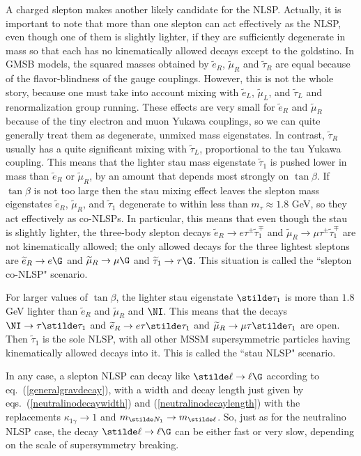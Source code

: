 A charged slepton makes another likely candidate for the NLSP.
Actually, it is important to note that more than one
slepton can act effectively as the NLSP, even though one of them is
slightly lighter, if they are sufficiently degenerate in mass so that each
has no kinematically allowed decays except to
the goldstino.
In GMSB models, the squared masses obtained by $\widetilde e_R$,
$\widetilde \mu_R$ and $\widetilde \tau_R$ are equal because of the
flavor-blindness of the gauge couplings. However, this is not the whole   
story, because
one must take into account mixing with
$\widetilde e_L$,
$\widetilde \mu_L$, and $\widetilde \tau_L$ and renormalization group
running.  These effects are very small for $\widetilde e_R$ and  
$\widetilde \mu_R$ because of the tiny electron and muon Yukawa couplings,
so we can quite generally treat them as degenerate, unmixed mass
eigenstates. In
contrast, $\widetilde \tau_R$ usually has a quite significant mixing with
$\widetilde \tau_L$, proportional to the tau Yukawa coupling. This means
that the lighter stau mass eigenstate $\widetilde \tau_1$ is pushed lower
in mass than $\widetilde e_R$ or $\widetilde \mu_R$, by an amount that
depends most strongly on $\tan\beta$.  If $\tan\beta$ is not too
large then the stau mixing effect leaves the slepton mass
eigenstates $\widetilde e_R$, $\widetilde \mu_R$, and $\widetilde \tau_1$
degenerate to within less than $m_\tau \approx 1.8 $ GeV, so they act
effectively as
co-NLSPs.  In particular, this means that even though the stau is slightly
lighter, the three-body slepton decays $\widetilde e_R \rightarrow
e\tau^\pm\widetilde \tau_1^\mp$ and $\widetilde \mu_R \rightarrow
\mu\tau^\pm\widetilde \tau_1^\mp$ are not kinematically allowed; the only
allowed decays for the three lightest sleptons are $\widetilde
e_R\rightarrow e \G$ and $\widetilde \mu_R \rightarrow \mu\G$ and
$\widetilde \tau_1 \rightarrow \tau \G$.
This situation is called the ``slepton co-NLSP"
scenario.

For larger values of $\tan\beta$, the lighter stau eigenstate
$\stilde \tau_1$ is
more than $1.8$ GeV lighter than $\widetilde e_R$ and $\widetilde \mu_R$
and $\NI$.  This means that the decays $\NI \rightarrow \tau\stilde
\tau_1$ and
$\widetilde e_R \rightarrow e \tau \stilde \tau_1$ and $\widetilde \mu_R
\rightarrow \mu \tau \stilde\tau_1$ are open.  Then $\widetilde
\tau_1$ is   
the sole NLSP, with all other MSSM supersymmetric particles having
kinematically allowed decays into it. This is called the ``stau NLSP"
scenario.

In any case, a slepton NLSP can decay like $\stilde \ell \rightarrow
\ell \G$ according to eq.~(\ref{generalgravdecay}), with a width and
decay length just given by eqs.~(\ref{neutralinodecaywidth})
and (\ref{neutralinodecaylength}) with the replacements $\kappa_{1\gamma}
\rightarrow 1$ and $m_{\stilde N_1} \rightarrow m_{\stilde \ell}$.
So, just as for the neutralino NLSP case, the decay $\stilde \ell
\rightarrow
\ell\G$ can be either fast or very slow, depending on the
scale of supersymmetry breaking.

